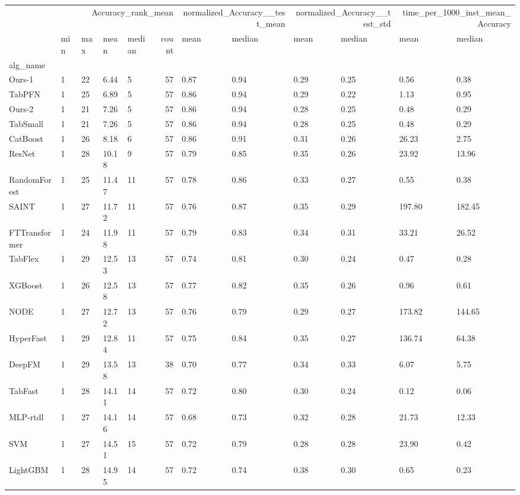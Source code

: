 \begin{tabular}{lllllrllllll}
\toprule
 & \multicolumn{5}{r}{Accuracy_rank_mean} & \multicolumn{2}{r}{normalized_Accuracy__test_mean} & \multicolumn{2}{r}{normalized_Accuracy__test_std} & \multicolumn{2}{r}{time_per_1000_inst_mean_Accuracy} \\
 & min & max & mean & median & count & mean & median & mean & median & mean & median \\
alg_name &  &  &  &  &  &  &  &  &  &  &  \\
\midrule
Ours-1 & 1 & 22 & 6.44 & 5 & 57 & 0.87 & 0.94 & 0.29 & 0.25 & 0.56 & 0.38 \\
TabPFN & 1 & 25 & 6.89 & 5 & 57 & 0.86 & 0.94 & 0.29 & 0.22 & 1.13 & 0.95 \\
Ours-2 & 1 & 21 & 7.26 & 5 & 57 & 0.86 & 0.94 & 0.28 & 0.25 & 0.48 & 0.29 \\
TabSmall & 1 & 21 & 7.26 & 5 & 57 & 0.86 & 0.94 & 0.28 & 0.25 & 0.48 & 0.29 \\
CatBoost & 1 & 26 & 8.18 & 6 & 57 & 0.86 & 0.91 & 0.31 & 0.26 & 26.23 & 2.75 \\
ResNet & 1 & 28 & 10.18 & 9 & 57 & 0.79 & 0.85 & 0.35 & 0.26 & 23.92 & 13.96 \\
RandomForest & 1 & 25 & 11.47 & 11 & 57 & 0.78 & 0.86 & 0.33 & 0.27 & 0.55 & 0.38 \\
SAINT & 1 & 27 & 11.72 & 11 & 57 & 0.76 & 0.87 & 0.35 & 0.29 & 197.80 & 182.45 \\
FTTransformer & 1 & 24 & 11.98 & 11 & 57 & 0.79 & 0.83 & 0.34 & 0.31 & 33.21 & 26.52 \\
TabFlex & 1 & 29 & 12.53 & 13 & 57 & 0.74 & 0.81 & 0.30 & 0.24 & 0.47 & 0.28 \\
XGBoost & 1 & 26 & 12.58 & 13 & 57 & 0.77 & 0.82 & 0.35 & 0.26 & 0.96 & 0.61 \\
NODE & 1 & 27 & 12.72 & 13 & 57 & 0.76 & 0.79 & 0.29 & 0.27 & 173.82 & 144.65 \\
HyperFast & 1 & 29 & 12.84 & 11 & 57 & 0.75 & 0.84 & 0.35 & 0.27 & 136.74 & 64.38 \\
DeepFM & 1 & 29 & 13.58 & 13 & 38 & 0.70 & 0.77 & 0.34 & 0.33 & 6.07 & 5.75 \\
TabFast & 1 & 28 & 14.11 & 14 & 57 & 0.72 & 0.80 & 0.30 & 0.24 & 0.12 & 0.06 \\
MLP-rtdl & 1 & 27 & 14.16 & 14 & 57 & 0.68 & 0.73 & 0.32 & 0.28 & 21.73 & 12.33 \\
SVM & 1 & 27 & 14.51 & 15 & 57 & 0.72 & 0.79 & 0.28 & 0.28 & 23.90 & 0.42 \\
LightGBM & 1 & 28 & 14.95 & 14 & 57 & 0.72 & 0.74 & 0.38 & 0.30 & 0.65 & 0.23 \\

\end{tabular}
